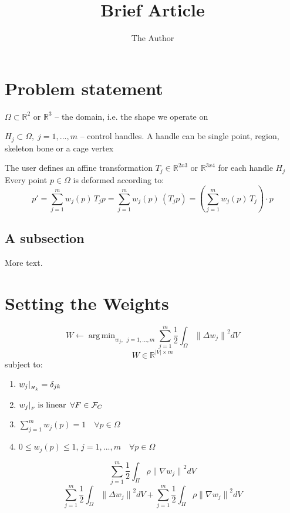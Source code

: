 \documentclass[11pt]{article} %
\title{Brief Article}
\author{The Author}
\newcommand{\norm}[2][]{{\|#2\|}_{#1}}
\DeclareMathOperator*{\argmin}{arg\,min}
\begin{document}
\maketitle

\section{Problem statement}

\begin{description}
	\item{$\Omega\subset \mathbb{R}^2$ or $\mathbb{R}^3$ --} the domain, i.e. the shape we operate on
	\item{$H_j \subset \Omega, \; j=1,...,m$ --} control handles. A handle can be single point, region, skeleton bone or a cage vertex
\end{description}
The user defines an affine transformation $T_j\in \mathbb{R}^ {2x3}$ or $\mathbb{R}^ {3x4}$ for each handle $H_j$  \\
Every point $p\in \Omega$ is deformed according to: 
\[
	p' = \sum_{j=1}^m w_j(p)\, T_jp  = \sum_{j=1}^m w_j(p)\, \left( T_jp \right) = \left( \sum_{j=1}^m w_j(p)\, T_j \right) \cdot p
\]

\subsection{A subsection}

More text.

\section{Setting the Weights}
\[
	W \leftarrow \argmin_{w_j,\enspace  j=1,...,m} \sum_{j=1}^m \frac{1}{2} \int_\Omega \norm{\Delta w_j}^2 dV
\]
\[
	W \in \mathbb{R}^{|V|\times m}
\]
subject to: 
\begin{enumerate}[label=\arabic*)]
	\item $w_j |_{\raisebox{-1pt}{\tiny $H_k$}} = \delta_{jk}$
	\item $w_j |_{\raisebox{-1pt}{\tiny $F$}} \; \text{is linear} \enspace \forall F\in \mathcal{F}_C $
	\item $\displaystyle\sum_{j=1}^ m w_j(p) = 1 \quad \forall p\in \Omega$
	\item $0\leq w_j(p) \leq 1, \, j=1,...,m \quad \forall p \in \Omega$
\end{enumerate}
\[
	\sum_{j=1}^m \frac{1}{2} \int_\Pi \rho \norm{\nabla w_j}^2 dV
\]
\[
	\sum_{j=1}^m \frac{1}{2} \int_\Omega \norm{\Delta w_j}^2 dV + \sum_{j=1}^m \frac{1}{2} \int_\Pi \rho \norm{\nabla w_j}^2 dV
\]
\end{document}

